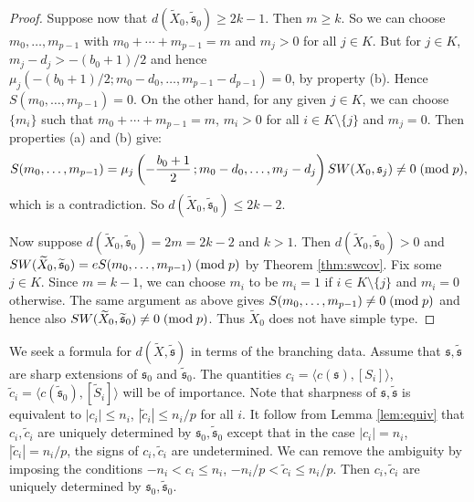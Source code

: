 \documentclass{amsart}
\theoremstyle{definition}
\theoremstyle{remark}
\numberwithin{equation}{section}
\begin{document}
\begin{proof}
Suppose now that $d(\widetilde{X}_0 , \widetilde{\mathfrak{s}}_0) \ge 2k-1$. Then $m \ge k$. So we can choose $m_0, \dots , m_{p-1}$ with $m_0 + \cdots + m_{p-1} = m$ and $m_j > 0$ for all $j \in K$. But for $j \in K$, $m_j -d_j > -(b_0+1)/2$ and hence $\mu_j( -(b_0+1)/2 ; m_0-d_0 , \dots , m_{p-1} - d_{p-1}) = 0$, by property (b). Hence $S(m_0 , \dots , m_{p-1} ) = 0$. On the other hand, for any given $j \in K$, we can choose $\{ m_i \}$ such that $m_0 + \cdots + m_{p-1} = m$, $m_i > 0$ for all $i \in K \setminus \{j\}$ and $m_j = 0$. Then properties (a) and (b) give:
\[
S(m_0 , \dots , m_{p-1}) = \mu_j \left( -\frac{b_0+1}{2} \, ; m_0-d_0 , \dots , m_j - d_j \right) SW(X_0 , \mathfrak{s}_j) \neq 0 \; ({\rm mod}\; p ),
\]
which is a contradiction. So $d(\widetilde{X}_0 , \widetilde{\mathfrak{s}}_0) \le 2k-2$.

Now suppose $d(\widetilde{X}_0 , \widetilde{\mathfrak{s}}_0) = 2m = 2k-2$ and $k > 1$. Then $d(\widetilde{X}_0 , \widetilde{\mathfrak{s}}_0) > 0$ and $SW(\widetilde{X}_0 , \widetilde{\mathfrak{s}}_0) = e S(m_0 , \dots , m_{p-1}) \; ({\rm mod} \; p)$ by Theorem \ref{thm:swcov}. Fix some $j \in K$. Since $m = k-1$, we can choose $m_i$ to be $m_i = 1$ if $i \in K \setminus \{j\}$ and $m_i = 0$ otherwise. The same argument as above gives $S(m_0 , \dots , m_{p-1}) \neq 0 \; ({\rm mod} \; p)$ and hence also $SW(\widetilde{X}_0 , \widetilde{\mathfrak{s}}_0) \neq 0 \; ({\rm mod} \; p)$. Thus $\widetilde{X}_0$ does not have simple type.
\end{proof}

We seek a formula for $d(\widetilde{X} , \widetilde{\mathfrak{s}})$ in terms of the branching data. Assume that $\mathfrak{s}, \widetilde{\mathfrak{s}}$ are sharp extensions of $\mathfrak{s}_0$ and $\widetilde{\mathfrak{s}}_0$. The quantities $c_i = \langle c(\mathfrak{s}) , [S_i] \rangle$, $\widetilde{c}_i = \langle c(\widetilde{\mathfrak{s}}_0) , [\widetilde{S}_i] \rangle$ will be of importance. Note that sharpness of $\mathfrak{s}, \widetilde{\mathfrak{s}}$ is equivalent to $| c_i | \le n_i$, $| \widetilde{c}_i | \le n_i/p$ for all $i$. It follow from Lemma \ref{lem:equiv} that $c_i, \widetilde{c}_i$ are uniquely determined by $\mathfrak{s}_0, \widetilde{\mathfrak{s}}_0$ except that in the case $|c_i | = n_i$, $|\widetilde{c}_i | = n_i/p$, the signs of $c_i, \widetilde{c}_i$ are undetermined. We can remove the ambiguity by imposing the conditions $-n_i < c_i \le n_i$, $-n_i/p < \widetilde{c}_i \le n_i/p$. Then $c_i, \widetilde{c}_i$ are uniquely determined by $\mathfrak{s}_0, \widetilde{\mathfrak{s}}_0$. 
\end{document}
